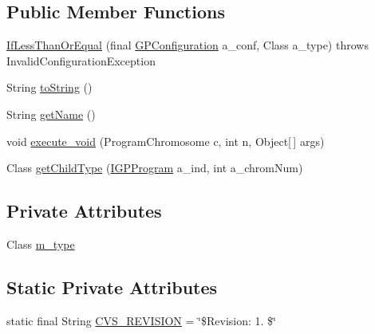 \subsection*{Public Member Functions}
\begin{DoxyCompactItemize}
\item 
\hyperlink{classexamples_1_1gp_1_1painted_desert_1_1_if_less_than_or_equal_afbeb97dd4f3f26ca302a8d79d41ecbe1}{If\-Less\-Than\-Or\-Equal} (final \hyperlink{classorg_1_1jgap_1_1gp_1_1impl_1_1_g_p_configuration}{G\-P\-Configuration} a\-\_\-conf, Class a\-\_\-type)  throws Invalid\-Configuration\-Exception 
\item 
String \hyperlink{classexamples_1_1gp_1_1painted_desert_1_1_if_less_than_or_equal_af5b3a1b4ac43c1884b40f2ae434aea49}{to\-String} ()
\item 
String \hyperlink{classexamples_1_1gp_1_1painted_desert_1_1_if_less_than_or_equal_a72d547402336569d03fde6de7e0894f8}{get\-Name} ()
\item 
void \hyperlink{classexamples_1_1gp_1_1painted_desert_1_1_if_less_than_or_equal_a2306c182d6be8210e8a636ce068d3c71}{execute\-\_\-void} (Program\-Chromosome c, int n, Object\mbox{[}$\,$\mbox{]} args)
\item 
Class \hyperlink{classexamples_1_1gp_1_1painted_desert_1_1_if_less_than_or_equal_abea18d00090e41d507de8098fd4d7cc9}{get\-Child\-Type} (\hyperlink{interfaceorg_1_1jgap_1_1gp_1_1_i_g_p_program}{I\-G\-P\-Program} a\-\_\-ind, int a\-\_\-chrom\-Num)
\end{DoxyCompactItemize}
\subsection*{Private Attributes}
\begin{DoxyCompactItemize}
\item 
Class \hyperlink{classexamples_1_1gp_1_1painted_desert_1_1_if_less_than_or_equal_ac958249b106da8b0e9eece489e87ffe2}{m\-\_\-type}
\end{DoxyCompactItemize}
\subsection*{Static Private Attributes}
\begin{DoxyCompactItemize}
\item 
static final String \hyperlink{classexamples_1_1gp_1_1painted_desert_1_1_if_less_than_or_equal_aeaea6d9a7c669d19be8910c047ce181b}{C\-V\-S\-\_\-\-R\-E\-V\-I\-S\-I\-O\-N} = \char`\"{}\$Revision\-: 1. \$\char`\"{}
\end{DoxyCompactItemize}
